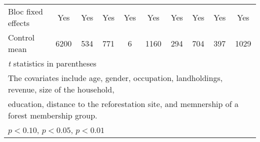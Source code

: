 {\begin{tabular}{l*{9}{c}}
Bloc fixed effects  &         Yes         &         Yes         &         Yes         &         Yes         &         Yes         &         Yes         &         Yes         &         Yes         &         Yes         \\
Control mean        &        6200         &         534         &         771         &           6         &        1160         &         294         &         704         &         397         &        1029         \\
\hline\hline
\multicolumn{10}{l}{\footnotesize \textit{t} statistics in parentheses}\\
\multicolumn{10}{l}{\footnotesize The covariates include age, gender, occupation, landholdings, revenue, size of the household,}\\
\multicolumn{10}{l}{\footnotesize education, distance to the reforestation site, and memnership of a forest membership group.}\\
\multicolumn{10}{l}{\footnotesize \sym{*} \(p<0.10\), \sym{**} \(p<0.05\), \sym{***} \(p<0.01\)}\\
\end{tabular}
}
